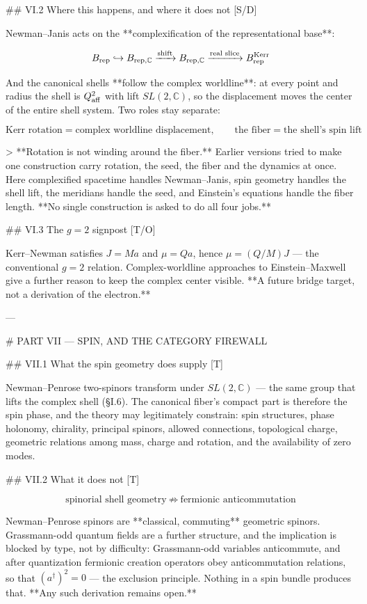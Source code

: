 ## VI.2 Where this happens, and where it does not [S/D]

Newman–Janis acts on the **complexification of the representational base**:

$$B_{\rm rep}\hookrightarrow B_{ {\rm rep},\mathbb{C} }\xrightarrow{\text{shift} }B_{ {\rm rep},\mathbb{C} }\xrightarrow{\text{real slice} }B_{\rm rep}^{\rm Kerr}$$

And the canonical shells **follow the complex worldline**: at every point and radius the shell is $Q^2_{\rm aff}$ with lift $SL(2,\mathbb{C})$, so the displacement moves the center of the entire shell system. Two roles stay separate:

$$\text{Kerr rotation} = \text{complex worldline displacement},\qquad \text{the fiber} = \text{the shell's spin lift}$$

> **Rotation is not winding around the fiber.** Earlier versions tried to make one construction carry rotation, the seed, the fiber and the dynamics at once. Here complexified spacetime handles Newman–Janis, spin geometry handles the shell lift, the meridians handle the seed, and Einstein's equations handle the fiber length. **No single construction is asked to do all four jobs.**

## VI.3 The $g = 2$ signpost [T/O]

Kerr–Newman satisfies $J = Ma$ and $\mu = Qa$, hence $\mu = (Q/M)J$ — the conventional $g = 2$ relation. Complex-worldline approaches to Einstein–Maxwell give a further reason to keep the complex center visible. **A future bridge target, not a derivation of the electron.**

---

# PART VII — SPIN, AND THE CATEGORY FIREWALL

## VII.1 What the spin geometry does supply [T]

Newman–Penrose two-spinors transform under $SL(2,\mathbb{C})$ — the same group that lifts the complex shell (§I.6). The canonical fiber's compact part is therefore the spin phase, and the theory may legitimately constrain: spin structures, phase holonomy, chirality, principal spinors, allowed connections, topological charge, geometric relations among mass, charge and rotation, and the availability of zero modes.

## VII.2 What it does not [T]

$$\text{spinorial shell geometry}\ \not\Rightarrow\ \text{fermionic anticommutation}$$

Newman–Penrose spinors are **classical, commuting** geometric spinors. Grassmann-odd quantum fields are a further structure, and the implication is blocked by type, not by difficulty: Grassmann-odd variables anticommute, and after quantization fermionic creation operators obey anticommutation relations, so that $(a^\dagger)^2 = 0$ — the exclusion principle. Nothing in a spin bundle produces that. **Any such derivation remains open.**


